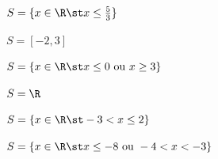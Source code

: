 \begin{exercises*}
\begin{exercise}
  \begin{answer}
    \begin{alphalist}
      \item $S=\{ x \in \R \st  x \leq \frac{5}{3} \}$
      \item $S=[-2,3]$
      \item $S=\{ x \in \R \st  x \leq 0 \text{ ou } x \geq 3 \}$
      \item $S= \R$
      \item $S=\{ x \in \R \st -3< x \leq 2 \}$
      \item $S=\{ x \in \R \st  x \leq -8 \text{ ou } -4<x<-3 \}$
    \end{alphalist}
  \end{answer}
\end{exercise}

\end{exercises*}
